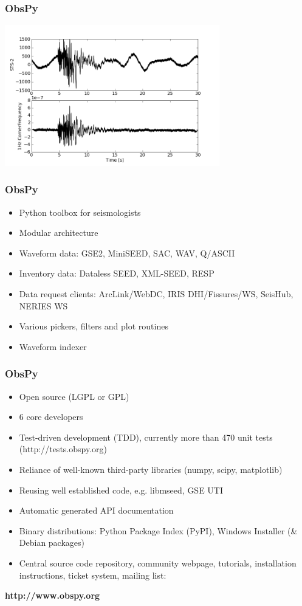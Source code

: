 \documentclass[t,10pt,compress=false,usepdftitle=false]{beamer}
\begin{document}
\begin{frame}[fragile]
    \frametitle{ObsPy}
    \begin{center}
      \includegraphics[width=0.7\textwidth]{arclink.png}
    \end{center}
\end{frame}

\begin{frame}[fragile]
    \frametitle{ObsPy}
    \begin{itemize}
        \item Python toolbox for seismologists
        \item Modular architecture
        \item Waveform data: GSE2, MiniSEED, SAC, WAV, Q/ASCII
        \item Inventory data: Dataless SEED, XML-SEED, RESP
        \item Data request clients: ArcLink/WebDC, IRIS DHI/Fissures/WS, SeisHub, NERIES WS
        \item Various pickers, filters and plot routines
        \item Waveform indexer
    \end{itemize}
\end{frame}

\begin{frame}[fragile]
    \frametitle{ObsPy}
    \begin{itemize}
        \item Open source (LGPL or GPL)
        \item 6 core developers
        \item Test-driven development (TDD), currently more than 470 unit tests (http://tests.obspy.org)
        \item Reliance of well-known third-party libraries (numpy, scipy, matplotlib)
        \item Reusing well established code, e.g. libmseed, GSE UTI
        \item Automatic generated API documentation
        \item Binary distributions: Python Package Index (PyPI), Windows Installer (\& Debian packages)
        \item Central source code repository, community webpage, tutorials, installation instructions, ticket system, mailing list:
    \end{itemize}
    \begin{center}
    \textbf{http://www.obspy.org}
    \end{center}
\end{frame}
\end{document}
